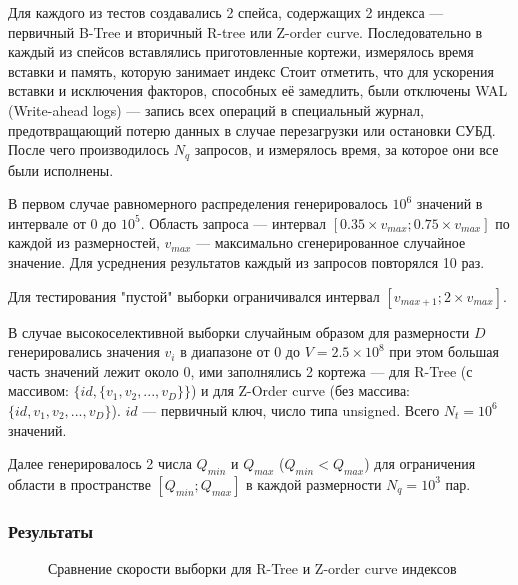 Для каждого из тестов создавались 2 спейса,
содержащих 2 индекса --- первичный B-Tree и вторичный R-tree или Z-order curve. Последовательно в каждый из спейсов вставлялись приготовленные кортежи,
измерялось время вставки и память, которую занимает индекс
Стоит отметить, что для ускорения вставки и исключения факторов,
способных её замедлить, были отключены WAL (Write-ahead logs) ---
запись всех операций в специальный журнал, предотвращающий потерю данных в случае перезагрузки или остановки СУБД.
После чего производилось $N_{q}$ запросов,
и измерялось время, за которое они все были исполнены.

В первом случае равномерного распределения генерировалось $10^6$ значений в интервале
от $0$ до $10^5$.
Область запроса --- интервал $[0.35 \times v_{max}; 0.75 \times v_{max}]$ по каждой из размерностей, $v_{max}$ --- максимально сгенерированное случайное значение. Для усреднения результатов каждый из запросов повторялся 10 раз.

Для тестирования "пустой" выборки ограничивался интервал $[v_{max + 1}; 2 \times v_{max}]$.

В случае высокоселективной выборки случайным образом для размерности $D$ генерировались значения $v_i$ в диапазоне от $0$ до $V = 2.5 \times 10^8$ при этом большая часть значений лежит около 0,
ими заполнялись 2 кортежа --- для R-Tree (с массивом: $\{id, \{v_1, v_2, ..., v_D\}\}$) и для Z-Order curve (без массива: $\{id, v_1, v_2, ..., v_D\}$). $id$ --- первичный ключ, число типа unsigned.
Всего $N_{t} = 10^6$ значений.

Далее генерировалось 2 числа $Q_{min}$ и $Q_{max}$ ($Q_{min} < Q_{max}$) для ограничения области в пространстве $[Q_{min}; Q_{max}]$ в каждой размерности $N_{q} = 10^3$ пар.

\subsubsection{Результаты}

\begin{figure}
	\centering
	\label{img:select_rtree_normal}
	\caption{Сравнение скорости выборки для R-Tree и Z-order curve индексов}
\end{figure}

